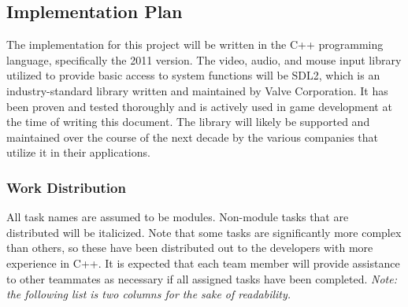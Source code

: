 \documentclass{article}
\begin{document}
	\subsection{Implementation Plan}
    The implementation for this project will be written in the C++ programming language, specifically the 2011 version. The video, audio, and mouse input library utilized to provide basic access to system functions will be SDL2, which is an industry-standard library written and maintained by Valve Corporation. It has been proven and tested thoroughly and is actively used in game development at the time of writing this document. The library will likely be supported and maintained over the course of the next decade by the various companies that utilize it in their applications.
    \subsubsection{Work Distribution}
      All task names are assumed to be modules. Non-module tasks that are distributed will be italicized. Note that some tasks are significantly more complex than others, so these have been distributed out to the developers with more experience in C++. It is expected that each team member will provide assistance to other teammates as necessary if all assigned tasks have been completed. \emph{Note: the following list is two columns for the sake of readability.}
\end{document}
